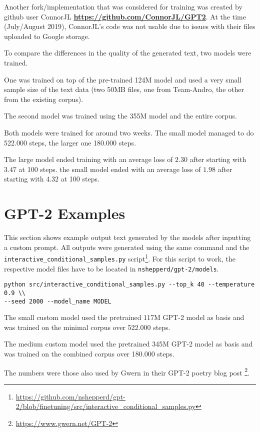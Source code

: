 \documentclass{scrartcl}
\newcommand{\burl}[1]{\textbf{\url{#1}}}
\begin{document}
Another fork/implementation that was considered for training was created by github user ConnorJL \burl{https://github.com/ConnorJL/GPT2}. At the time (July/August 2019), ConnorJL's code was not usable due to issues with their files uploaded to Google storage.

To compare the differences in the quality of the generated text, two models were trained.

One was trained on top of the pre-trained 124M model and used a very small sample size of the text data (two 50MB files, one from Team-Andro, the other from the existing corpus).

The second model was trained using the 355M model and the entire corpus. 

Both models were trained for around two weeks. The small model managed to do 522.000 steps, the larger one 180.000 steps.

The large model ended training with an average loss of $ 2.30 $ after starting with $ 3.47 $ at 100 steps.
the small model ended with an average loss of $ 1.98 $ after starting with $ 4.32 $ at 100 steps.


\section{GPT-2 Examples}

This section shows example output text generated by the models after inputting a custom prompt. All outputs were generated using the same command and the \\ \texttt{interactive\_conditional\_samples.py} script\footnote{\url{https://github.com/nshepperd/gpt-2/blob/finetuning/src/interactive_conditional_samples.py}}.
For this script to work, the respective model files have to be located in \texttt{nshepperd/gpt-2/models}.
\begin{verbatim}
python src/interactive_conditional_samples.py --top_k 40 --temperature 0.9 \\
--seed 2000 --model_name MODEL
\end{verbatim}

The small custom model used the pretrained 117M GPT-2 model as basis and was trained on the minimal corpus over 522.000 steps.

The medium custom model used the pretrained 345M GPT-2 model as basis and was trained on the combined corpus over 180.000 steps.




The numbers were those also used by Gwern in their GPT-2 poetry blog post \footnote{\url{https://www.gwern.net/GPT-2}}.
\end{document}
